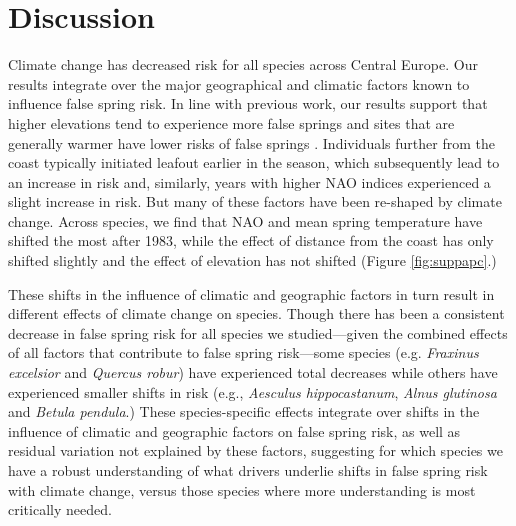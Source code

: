\documentclass{article}\usepackage[]{graphicx}\usepackage[]{color}
\begin{document}
\renewcommand{\thetable}{\arabic{table}}
\renewcommand{\thefigure}{\arabic{figure}}
\renewcommand{\labelitemi}{$-$}




\section*{Discussion}
Climate change has decreased risk for all species across Central Europe. Our results integrate over the major geographical and climatic factors known to influence false spring risk. In line with previous work, our results support that higher elevations tend to experience more false springs \citep{Vitasse2018, Vitra2017} and sites that are generally warmer have lower risks of false springs \citep{Wypych2016}. Individuals further from the coast typically initiated leafout earlier in the season, which subsequently lead to an increase in risk and, similarly, years with higher NAO indices experienced a slight increase in risk. But many of these factors have been re-shaped by climate change. Across species, we find that NAO and mean spring temperature have shifted the most after 1983, while the effect of distance from the coast has only shifted slightly and the effect of elevation has not shifted (Figure \ref{fig:suppapc}.) 

These shifts in the influence of climatic and geographic factors in turn result in different effects of climate change on species. Though there has been a consistent decrease in false spring risk for all species we studied---given the combined effects of all factors that contribute to false spring risk---some species (e.g. \textit{Fraxinus excelsior} and \textit{Quercus robur}) have experienced total decreases while others have experienced smaller shifts in risk (e.g., \textit{Aesculus hippocastanum}, \textit{Alnus glutinosa} and \textit{Betula pendula}.) These species-specific effects integrate over shifts in the influence of climatic and geographic factors on false spring risk, as well as residual variation not explained by these factors, suggesting for which species we have a robust understanding of what drivers underlie shifts in false spring risk with climate change, versus those species where more understanding is most critically needed. 
\end{document}
